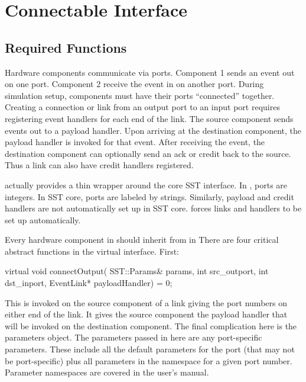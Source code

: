 
\chapter{\sstmacro Connectable Interface}\label{chapter:Connectables}

\section{Required Functions}

Hardware components communicate via ports. Component 1 sends an event out on one port.
Component 2 receive the event in on another port.
During simulation setup, components must have their ports ``connected'' together.
Creating a connection or link from an output port to an input port requires registering event handlers for each end of the link.
The source component sends events out to a payload handler. 
Upon arriving at the destination component, the payload handler is invoked for that event.
After receiving the event, the destination component can optionally send an ack or credit back to the source.
Thus a link can also have credit handlers registered.

\sstmacro actually provides a thin wrapper around the core SST interface.
In \sstmacro, ports are integers.
In SST core, ports are labeled by strings.
Similarly, payload and credit handlers are not automatically set up in SST core.
\sstmacro forces links and handlers to be set up automatically.

Every hardware component in \sstmacro should inherit from  in 
There are four critical abstract functions in the virtual interface. First:

\begin{CppCode}
  virtual void connectOutput(
    SST::Params& params,
    int src_outport,
    int dst_inport,
    EventLink* payloadHandler) = 0;
\end{CppCode}
This is invoked on the source component of a link giving the port numbers on either end of the link.
It gives the source component the payload handler that will be invoked on the destination component.
The final complication here is the parameters object.
The parameters passed in here are any port-specific parameters.
These include all the default parameters for the port (that may not be port-specific)
plus all parameters in the namespace  for a given port number.
Parameter namespaces are covered in the user's manual.

